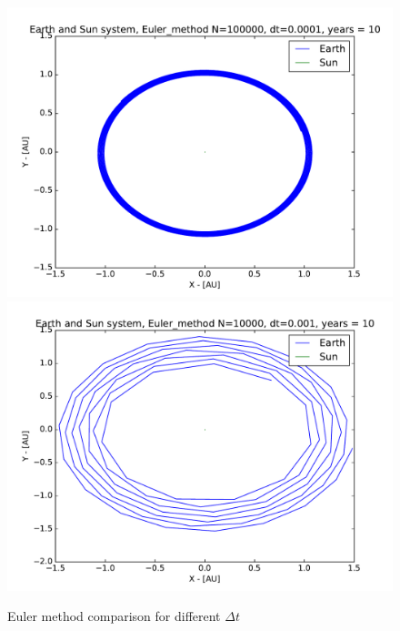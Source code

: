 \documentclass[12pt]{article}
\begin{document}
\begin{figure}[hbtp]
\centering
\includegraphics[width=\linewidth]{Plots/Earth_Sun_Euler_method.pdf}
\includegraphics[width=\linewidth]{Plots/Earth_Sun_Euler_method_larger_dt.pdf} 
\caption{Euler method comparison for different $\Delta t$}
\end{figure}
\end{document}
